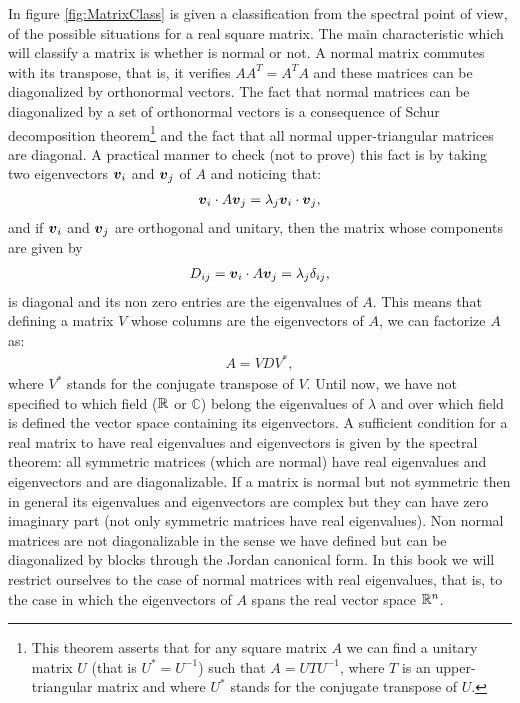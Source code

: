      In figure \ref{fig:MatrixClass} is given a classification from the spectral point of view, of the possible situations for a real square matrix. The main characteristic which will classify a matrix is whether is normal or not. A normal matrix commutes with its transpose, that is, it verifies $AA^T=A^TA$ and these matrices can be diagonalized by orthonormal vectors. The fact that normal matrices can be diagonalized by a set of orthonormal vectors is a consequence of Schur decomposition theorem\footnote{This theorem asserts that for any square matrix $A$ we can find a unitary matrix $U$ (that is $U^*=U^{-1}$) such that $A=UTU^{-1}$, where $T$ is an upper-triangular matrix and where $U^*$ stands for the conjugate transpose of $U$.} and the fact that all normal upper-triangular matrices are diagonal. A practical manner to check (not to prove) this fact is by taking two eigenvectors $\boldsymbol{v}_i$ and $\boldsymbol{v}_j$ of $A$ and noticing that:
     \begin{align}
     	\boldsymbol{v}_i \cdot A \boldsymbol{v}_j = \lambda_j\boldsymbol{v}_i \cdot\boldsymbol{v}_j,
     \end{align}
     and if $\boldsymbol{v}_i$ and $\boldsymbol{v}_j$ are orthogonal and unitary,  then the matrix whose components are given by
     \begin{align*}
     	D_{ij} = \boldsymbol{v}_i \cdot A \boldsymbol{v}_j = \lambda_j\delta_{ij},
     \end{align*}
     is diagonal and its non zero entries are the eigenvalues of $A$. This means that defining a matrix $V$ whose columns are the eigenvectors of $A$, we can factorize $A$ as:
     \begin{align}
     	A = V D V^*,
     \end{align}
     where $V^*$ stands for the conjugate transpose of $V$. Until now, we have not specified to which field ($\mathbb{R}^{}$ or $\mathbb{C}$) belong the eigenvalues of $\lambda$ and over which field is defined the vector space containing its eigenvectors. A sufficient condition for a real matrix to have real eigenvalues and eigenvectors is given by the spectral theorem: all symmetric matrices (which are normal) have real eigenvalues and eigenvectors and are diagonalizable. If a matrix is normal but not symmetric then in general its eigenvalues and eigenvectors are complex but they can have zero imaginary part (not only symmetric matrices have real eigenvalues). Non normal matrices are not diagonalizable in the sense we have defined but can be diagonalized by blocks through the Jordan canonical form. In this book we will restrict ourselves to the case of normal matrices with real eigenvalues, that is, to the case in which the eigenvectors of $A$ spans the real vector space $\mathbb{R}^{n}$.
     
